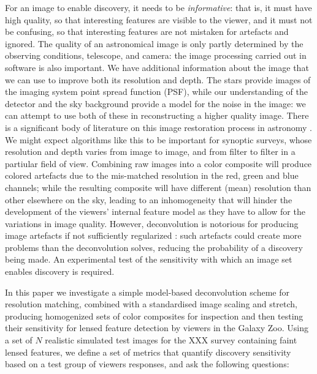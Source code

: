 \documentclass[letterpaper, 11pt]{article}
\begin{document}
For an image to enable discovery, it needs to be {\it informative}: that is,
it must have high quality, so that interesting features are visible to the
viewer, and it must not be confusing, so that interesting features are not
mistaken for artefacts and ignored. The quality of an astronomical image is
only partly determined by the observing conditions, telescope, and camera: the
image processing carried out in software is also important. We have additional
information about the image that we can use to improve both its resolution and
depth. The stars provide images of the imaging system point spread function
(PSF), while our understanding of the detector and the sky background provide
a model for the noise in the image: we can attempt to use both of these in
reconstructing a higher quality image. There is a significant body of
literature on this image restoration process in astronomy \citep[e.g.][]{Ric72, N+N82, S+B84, P+P93, MCS98}. We might
expect algorithms like this to be important for synoptic surveys, whose
resolution and depth varies from image to image, and from filter to filter in
a partiular field of view. Combining raw images into a color composite will
produce colored artefacts due to the mis-matched resolution in the red, green
and blue channels; while the resulting composite will have different (mean)
resolution than other elsewhere on the sky, leading to an inhomogeneity that
will hinder the development of the viewers' internal feature model as they
have to allow for the variations in image quality. However, deconvolution is
notorious for producing image artefacts if not sufficiently regularized
\citep[see, for example, comments at the end of section~1 of][]{MCS98}: such artefacts could
create more problems than the deconvolution solves, reducing the probability
of a discovery being made.  An experimental test of the sensitivity with which
an image set enables discovery is required.

In this paper we investigate a simple model-based deconvolution scheme for
resolution matching, combined with a standardised image scaling and stretch,
producing homogenized sets of color composites for inspection and then testing
their sensitivity for lensed feature detection by viewers in the Galaxy Zoo.
Using a set of $N$ realistic simulated test images for the XXX survey 
containing faint lensed features, we define a set of metrics that quantify
discovery sensitivity based on a test group of viewers responses, and 
ask the following questions:
\end{document}
